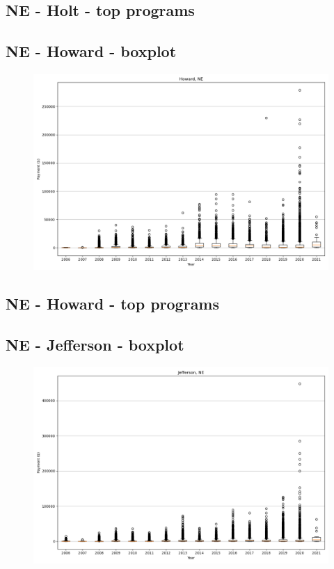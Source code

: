 \subsection*{NE - Holt - top programs}

\newpage
\subsection*{NE - Howard - boxplot}
\begin{figure}[h]
\centering
\includegraphics[width=7in]{../output/boxplots/counties/Howard-NE_boxplot.png}
\end{figure}


\subsection*{NE - Howard - top programs}

\newpage
\subsection*{NE - Jefferson - boxplot}
\begin{figure}[h]
\centering
\includegraphics[width=7in]{../output/boxplots/counties/Jefferson-NE_boxplot.png}
\end{figure}


